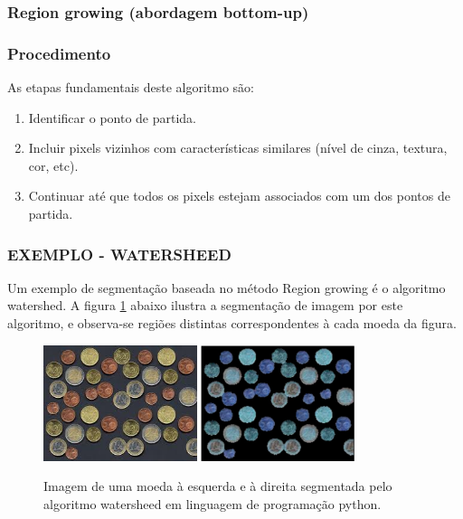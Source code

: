 \subsubsection{Region growing (abordagem bottom-up)}
\subsubsection*{Procedimento}
As etapas fundamentais deste algoritmo são: 
\begin{enumerate}
    \item Identificar o ponto de partida.
    \item Incluir pixels vizinhos com características similares (nível de cinza, textura, cor, etc).
    \item Continuar até que todos os pixels estejam associados com um dos pontos de partida.
\end{enumerate}

\subsubsection*{EXEMPLO - WATERSHEED}
Um exemplo de segmentação baseada no método Region growing é o algoritmo watershed. A figura \ref{fig:coins} abaixo ilustra a segmentação de imagem por este algoritmo, e observa-se regiões distintas correspondentes à cada moeda da figura.

\begin{figure}[!htb]
 \centering
 \def\baselinestretch{1}\small\normalsize
 \includegraphics[width=0.4\textwidth]{img/stf-coins.jpg}\qquad
 \includegraphics[width=0.4\textwidth]{img/stf-coins-watersheed.jpg} 
 \caption{\label{fig:coins}Imagem de uma moeda \citep{stanford} à esquerda e à direita segmentada pelo algoritmo watersheed em linguagem de programação python.}
\end{figure}
 
